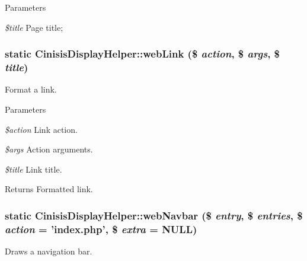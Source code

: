 \begin{DoxyParams}{Parameters}
\item[{\em \$title}]Page title; \end{DoxyParams}
\hypertarget{classCinisisDisplayHelper_aadc869909d8be43402d73fa3415827b4}{
\subsubsection[{webLink}]{\setlength{\rightskip}{0pt plus 5cm}static CinisisDisplayHelper::webLink (\$ {\em action}, \/  \$ {\em args}, \/  \$ {\em title})}}
\label{classCinisisDisplayHelper_aadc869909d8be43402d73fa3415827b4}
Format a link.


\begin{DoxyParams}{Parameters}
\item[{\em \$action}]Link action.\item[{\em \$args}]Action arguments.\item[{\em \$title}]Link title.\end{DoxyParams}
\begin{DoxyReturn}{Returns}
Formatted link. 
\end{DoxyReturn}
\hypertarget{classCinisisDisplayHelper_a291e2da97fd646e7fa34fb92879fc3d6}{
\subsubsection[{webNavbar}]{\setlength{\rightskip}{0pt plus 5cm}static CinisisDisplayHelper::webNavbar (\$ {\em entry}, \/  \$ {\em entries}, \/  \$ {\em action} = {\ttfamily 'index.php'}, \/  \$ {\em extra} = {\ttfamily NULL})}}
\label{classCinisisDisplayHelper_a291e2da97fd646e7fa34fb92879fc3d6}
Draws a navigation bar.


